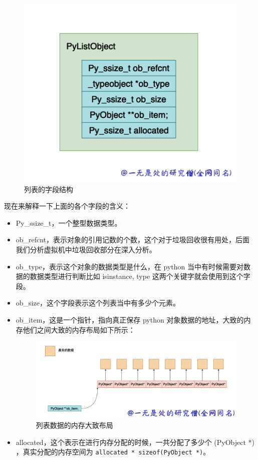     \begin{figure}[H]
        \centering
            \includegraphics[scale=.5]{images/01-list.png}
            \caption{列表的字段结构}
        \label{fig:my_label}
    \end{figure}
    
现在来解释一下上面的各个字段的含义：
\begin{itemize}
\setlength{\itemsep}{0pt}
\item Py\_ssize\_t，一个整型数据类型。 
\item ob\_refcnt，表示对象的引用记数的个数，这个对于垃圾回收很有用处，后面我们分析虚拟机中垃圾回收部分在深入分析。 
\item ob\_type，表示这个对象的数据类型是什么，在 python 当中有时候需要对数据的数据类型进行判断比如 isinstance, type 这两个关键字就会使用到这个字段。 
\item ob\_size，这个字段表示这个列表当中有多少个元素。 
\item ob\_item，这是一个指针，指向真正保存 python 对象数据的地址，大致的内存他们之间大致的内存布局如下所示： 

    \begin{figure}[H]
        \centering
            \includegraphics[scale=.3]{images/02-list.png}
        \caption{列表数据的内存大致布局}
        \label{fig:my_label}
    \end{figure}
    
\item allocated，这个表示在进行内存分配的时候，一共分配了多少个 (PyObject *) ，真实分配的内存空间为 \verb|allocated * sizeof(PyObject *)|。 
\end{itemize}

